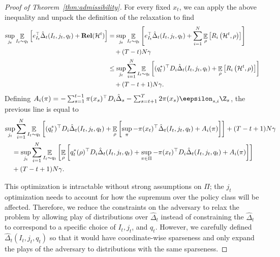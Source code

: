 \documentclass{article}
\newcommand{\exop}{\mathop{\ex}}
\newcommand{\rel}{\mathbf{Rel}}
\newcommand{\hist}{{\mathcal H}}
\begin{document}
\begin{proof}[Proof of Theorem~\ref{thm:admissibility}]
For every fixed $x_t$, we can apply the above inequality and unpack the definition of the relaxation to find
\begin{align*}
  \sup_{j_t} \mathop{\ex}_{I_t\sim q_t}\left[e_{I_t}^\top\hat\Delta_t(I_t,j_t,q_t)
  +  \rel(\hist^t) \right]
  &=
    \sup_{j_t } \mathop{\ex}_{I_t\sim q_t}\left[e_{I_t}^\top\hat\Delta_t(I_t,j_t,q_t)
    +  \sum_{i=1}^N \exop_\rho\left[R_i\left(\hist^{t},\rho\right)\right]\right]\\
  &\quad + (T-t)N\gamma\\
  &\leq
    \sup_{j_t} \sum_{i=1}^N \mathop{\ex}_{I_t\sim q_t}\left[(q_t^*)^\top D_i \hat\Delta_t(I_t,j_t,q_t)
    +
  \exop_\rho\left[R_i\left(\hist^{t},\rho\right)\right]\right]\\
  &\quad+(T-t+1)N\gamma.
\end{align*}
Defining $A_i(\pi) = -\sum_{s=1}^{t-1} \pi(x_s)^\top D_i \hat \Delta_s - \sum_{s=t+1}^T 2\pi(x_s) \eepsilon_{s,i} \Z_{s}$, the previous line is equal to
\begin{align*}
\lefteqn{\sup_{j_t} \sum_{i=1}^N \mathop{\ex}_{I_t\sim q_t}\left[(q_t^*)^\top D_i \hat\Delta_t(I_t,j_t,q_t)
    +
  \mathop{\ex}_{\rho}\left[\sup_{\pi} - \pi(x_t)^\top \hat\Delta_t(I_t,j_t,q_t) + A_i(\pi)
  \right]\right] + (T-t+1)N\gamma}\\
  &\quad =
    \sup_{j_t} \sum_{i=1}^N\mathop{\ex}_{I_t\sim q_t}\left[\mathop{\ex}_{\rho}\left[ q_t^*(\rho)^\top D_i \hat \Delta_t (I_t,j_t,q_t)
    +
    \sup_{\pi\in\Pi} -\pi(x_t)^\top D_i\hat\Delta_t(I_t,j_t,q_t) + A_i(\pi)\right]\right]\\
  &\quad+ (T-t+1)N\gamma.
\end{align*}

This optimization is intractable without strong assumptions on $\Pi$; the $j_t$ optimization needs to account for how the supremum over the policy class will be affected. Therefore, we reduce the constraints on the adversary to relax the problem by allowing play of distributions over $\hat\Delta_t$ instead of constraining the $\hat\Delta_t$ to correspond to 
a specific choice of $I_t,j_t$, and $q_t$. However, we carefully defined $\hat\Delta_t(I_t,j_t,q_t)$ so that it would have coordinate-wise sparseness and only expand the plays of the adversary to distributions with the same sparseness.


\end{proof}
\end{document}
